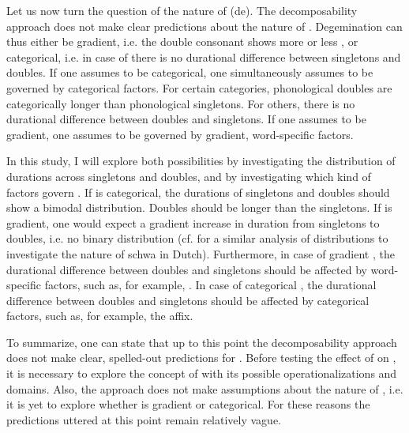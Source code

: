 Let us now turn the question of the nature of (de). The decomposability approach does not make clear predictions about the nature of . Degemination can thus either be gradient, i.e. the double consonant shows more or less , or categorical, i.e. in case of  there is no durational difference between singletons and doubles. %
If one assumes  to be categorical, one simultaneously assumes  to be governed by categorical factors. For certain categories, phonological doubles are categorically longer than phonological singletons. For others, there is no durational difference between doubles and singletons. 
If one assumes  to be gradient, one assumes  to be governed by gradient, word-specific factors.

In this study, I will explore both possibilities by investigating the distribution of durations across singletons and doubles, and by investigating which kind of factors govern . %
If  is categorical, the durations of singletons and doubles should show a bimodal distribution. Doubles should be longer than the singletons. If  is gradient, one would expect a gradient increase in duration from singletons to doubles, i.e. no binary distribution (cf.  \cite{Hanique.06.03.2013} for a similar analysis of distributions to investigate the nature of schwa  in Dutch). Furthermore, in case of gradient , the durational difference between doubles and singletons should be affected by word-specific factors, such as, for example, . In case of categorical , the durational difference between doubles and singletons should be affected by categorical factors, such as, for example, the affix.
 
To summarize, one can state that up to this point the decomposability approach does not make clear, spelled-out predictions for . Before testing the effect of  on , it is necessary to explore the concept of  with its possible operationalizations and domains. Also, the approach does not make assumptions about the nature of , i.e. it is yet to explore whether  is gradient or categorical. 
For these reasons the predictions uttered at this point remain relatively vague. 

